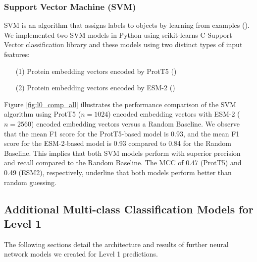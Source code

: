 \documentclass{bioinfo}
\begin{document}


\subsubsection{Support Vector Machine (SVM)}
SVM is an algorithm that assigns labels to objects by learning from examples (\cite{svm}).
We implemented two SVM models in Python using scikit-learns C-Support Vector classification library and these models using two distinct types of 
input features: 
\begin{enumerate}
	\item[(1)] Protein embedding vectors encoded by ProtT5 (\cite{ProtT5})
	\item[(2)] Protein embedding vectors encoded by ESM-2 (\cite{ESM2})
\end{enumerate}

Figure \ref{fig:l0_comp_all} illustrates the performance comparison of the SVM algorithm using ProtT5 ($n=1024$) 
encoded embedding vectors with ESM-2 ($n=2560$) encoded embedding vectors versus a Random Baseline. 
We observe that the mean F1 score for the ProtT5-based model is 0.93, and the mean F1 score for the ESM-2-based model is 0.93 compared to 0.84 for the Random Baseline. This implies that both SVM models perform 
with superior precision and recall compared to the Random Baseline. The MCC of 0.47 (ProtT5) and 0.49 (ESM2),
respectively, underline that both models perform better than random guessing.


\subsection{Additional Multi-class Classification Models for Level 1}
The following sections detail the architecture and results of further neural network models we created for Level 1 predictions.
\end{document}
